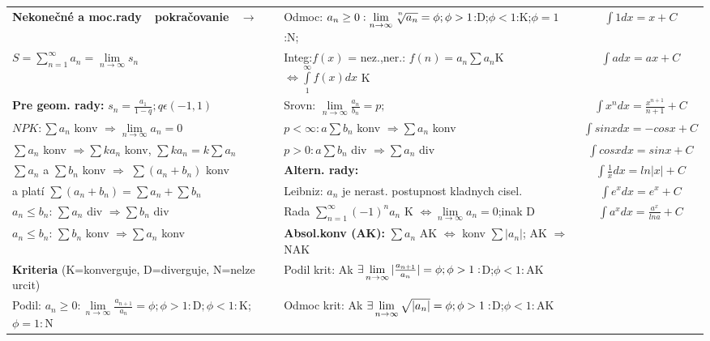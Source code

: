 \documentclass[8pt]{extarticle}
\begin{document}
\begin{tabular}{l|l|c}
\textbf{Nekonečné a moc.rady~\vline ~pokračovanie~ $\rightarrow$} & Odmoc: $a_n\ge0:\lim\limits_{n\rightarrow\infty}\sqrt[\uproot{5}n]{a_n}=\phi;\phi>1$:D;$\phi<1$:K;$\phi=1$:N; & $\int 1dx=x+C$ \\

$S=\sum\limits_{n=1}^\infty a_n = \lim\limits_{n\rightarrow\infty} s_n$ & Integ:$f(x)$ = nez.,ner.: $f(n)=a_n \sum a_n $K $ \Leftrightarrow \int\limits_1^\infty f(x)dx$ K & $\int adx=ax+C$\\

\textbf{Pre geom. rady: }$s_n=\frac{a_1}{1-q}; q \epsilon (-1,1)$ & Srovn: $\lim\limits_{n\rightarrow\infty} \frac{a_n}{b_n}=p;$ & $\int x^ndx=\frac{x^{n+1}}{n+1}+C$ \\

$NPK: \sum a_n$ konv $\Rightarrow \lim\limits_{n\rightarrow\infty} a_n = 0 $ & $p<\infty: a\sum{b_n}$ konv $\Rightarrow \sum{a_n}$ konv & $\int sinxdx=-cosx+C$\\

$\sum a_n$ konv $\Rightarrow \sum ka_n$ konv, $\sum ka_n = k \sum a_n $ & $p>0: a\sum{b_n}$ div $\Rightarrow \sum{a_n}$ div & $\int cosxdx=sinx+C$\\

$\sum a_n$ a $\sum b_n$ konv $\Rightarrow$ $\sum (a_n+b_n) $ konv & \textbf{Altern. rady:} & $\int \frac{1}{x}dx=ln|x|+C$ \\

a platí $\sum (a_n+b_n)=\sum a_n + \sum b_n$ & Leibniz: $a_n$ je nerast. postupnost kladnych cisel. & $\int e^xdx=e^x+C$ \\

$a_n \leq b_n$: $\sum a_n$ div $\Rightarrow \sum b_n$ div & Rada $\sum\limits_{n=1}^\infty (-1)^n a_n$ K $\Leftrightarrow\lim\limits_{n\rightarrow\infty}a_n=0$;inak D & $\int a^xdx=\frac{a^x}{ln a}+C$\\

$a_n \leq b_n$: $\sum b_n$ konv $\Rightarrow \sum a_n$ konv & \textbf{Absol.konv (AK): } $\sum a_n$ AK $\Leftrightarrow$ konv $\sum |a_n|$; AK $\Rightarrow$ NAK & \\
\textbf{Kriteria} (K=konverguje, D=diverguje, N=nelze urcit) & Podil krit: Ak $\exists \lim\limits_{n\rightarrow\infty} \arrowvert{\frac{a_{n+1}}{a_n}}\arrowvert{}=\phi;\phi>1:$D;$\phi<1:$AK & \\
Podil: $a_n\ge 0: \lim\limits_{n\rightarrow \infty} \frac{a_{n+1}}{a_n}=\phi;\phi>1:$D$;\phi<1:$K;$\phi=1:$N & Odmoc krit: Ak $\exists \lim\limits_{n\rightarrow\infty} \sqrt{\arrowvert{{a_n}}\arrowvert{}}=\phi;\phi>1:$D;$\phi<1:$AK & \\



\end{tabular}
\end{document}
